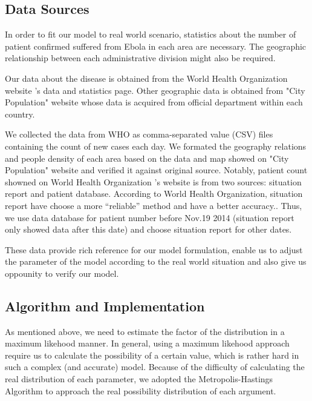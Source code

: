 \documentclass[11pt]{article}
\begin{document}
\subsection{Data Sources}

In order to fit our model to real world scenario, statistics about the number of patient confirmed suffered from Ebola in each area are necessary. The geographic relationship between each administrative division might also be required.

Our data about the disease is obtained from the World Health Organization website 's data and statistics page. Other geographic data is obtained from "City Population" website\cite{citypop} whose data is acquired from official department within each country\cite{liberia,sierraleone,guinea}.

We collected the data from WHO as comma-separated value (CSV) files containing the count of new cases each day. We formated the geography relations and people density of each area based on the data and map showed on "City Population" website and verified it against original source. Notably, patient count showned on World Health Organization 's website is from two sources: situation report and patient database. According to World Health Organization, situation report have choose a more ``reliable'' method and have a better accuracy.\cite{whositrep}. Thus, we use data database for patient number before Nov.19 2014 (situation report only showed data after this date) and choose situation report for other dates. 

These data provide rich reference for our model formulation, enable us to adjust the parameter of the model according to the real world situation and also give us oppounity to verify our model.

\subsection{Algorithm and Implementation}

As mentioned above, we need to estimate the factor of the distribution in a maximum likehood manner. In general, using a maximum likehood approach require us to calculate  the possibility of a certain value, which is rather hard in such a complex (and accurate) model. Because of the difficulty of calculating the real distribution of each parameter, we adopted the Metropolis-Hastings Algorithm\cite{besag1993spatial} to approach the real possibility distribution of each argument.
\end{document}
